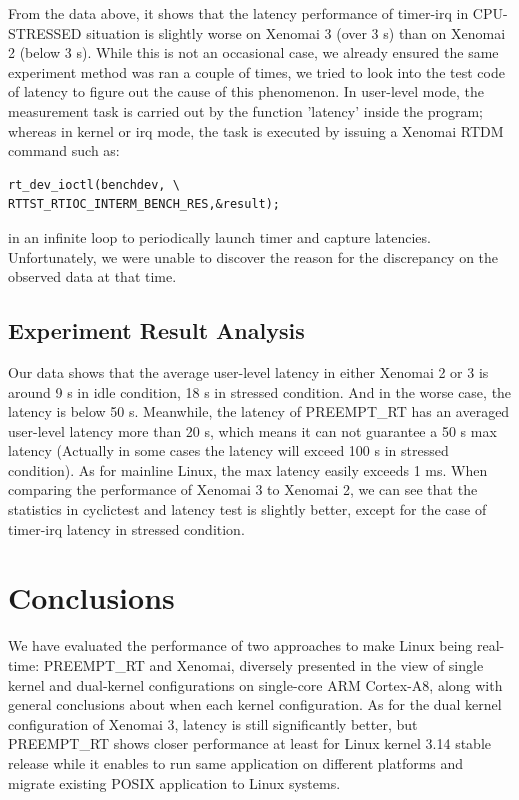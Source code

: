 \documentclass[10pt,a4paper]{article}
\begin{document}
\begin{multicols}{2}
From the data above, it shows that the latency performance of timer-irq in CPU-STRESSED situation is slightly worse on Xenomai 3 (over 3 \textmu s) than on Xenomai 2 (below 3 \textmu s). While this is not an occasional case, we already ensured the same experiment method was ran a couple of times, we tried to look into the test code of latency to figure out the cause of this phenomenon. In user-level mode, the measurement task is carried out by the function 'latency' inside the program; whereas in kernel or irq mode, the task is executed by issuing a Xenomai RTDM command such as:
\begin{verbatim}
rt_dev_ioctl(benchdev, \
RTTST_RTIOC_INTERM_BENCH_RES,&result); 
\end{verbatim} 
in an infinite loop to periodically launch timer and capture latencies. Unfortunately, we were unable to discover the reason for the discrepancy on the observed data at that time.

\subsection{Experiment Result Analysis}
Our data shows that the average user-level latency in either Xenomai 2 or 3 is around 9 \textmu s in idle condition, 18 \textmu s in stressed condition. And in the worse case, the latency is below 50 \textmu s. Meanwhile, the latency of PREEMPT\_RT has an averaged user-level latency more than 20 \textmu s, which means it can not guarantee a 50 \textmu s max latency (Actually in some cases the latency will exceed 100 \textmu s in stressed condition).  As for mainline Linux, the max latency easily exceeds 1 ms. When comparing the performance of Xenomai 3 to Xenomai 2, we can see that the statistics in cyclictest and latency test is slightly better, except for the case of timer-irq latency in stressed condition.

\section{Conclusions}
We have evaluated the performance of two approaches to make Linux being real-time: PREEMPT\_RT and Xenomai, diversely presented in the view of single kernel and dual-kernel configurations on single-core ARM Cortex-A8, along with general conclusions about when each kernel configuration. As for the dual kernel configuration of Xenomai 3, latency is still significantly better, but PREEMPT\_RT shows closer performance at least for Linux kernel 3.14 stable release while it enables to run same application on different platforms and migrate existing POSIX application to Linux systems.


\end{multicols}
\end{document}

